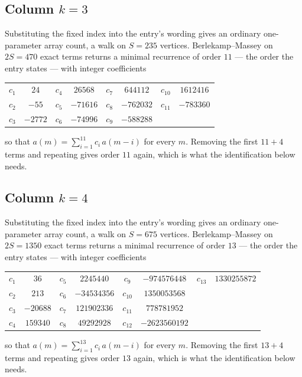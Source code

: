 \documentclass[11pt,a4paper]{article}
\theoremstyle{plain}
\theoremstyle{definition}
\begin{document}
\subsection*{Column $k=3$}
Substituting the fixed index into the entry's wording gives an ordinary one-parameter array
count, a walk on $S=235$ vertices. Berlekamp--Massey on $2S=470$ exact terms
returns a minimal recurrence of order $11$ --- the order the entry states --- with
integer coefficients
\begin{center}\small\begin{tabular}{cccccccc}
$c_{1}$ & $24$ & $c_{4}$ & $26568$ & $c_{7}$ & $644112$ & $c_{10}$ & $1612416$ \\
$c_{2}$ & $-55$ & $c_{5}$ & $-71616$ & $c_{8}$ & $-762032$ & $c_{11}$ & $-783360$ \\
$c_{3}$ & $-2772$ & $c_{6}$ & $-74996$ & $c_{9}$ & $-588288$ &  &  \\
\end{tabular}\end{center}
so that $a(m)=\sum_{i=1}^{11}c_i\,a(m-i)$ for every $m$. Removing the first
$11+4$ terms and repeating gives order $11$ again, which is what the
identification below needs.

\subsection*{Column $k=4$}
Substituting the fixed index into the entry's wording gives an ordinary one-parameter array
count, a walk on $S=675$ vertices. Berlekamp--Massey on $2S=1350$ exact terms
returns a minimal recurrence of order $13$ --- the order the entry states --- with
integer coefficients
\begin{center}\small\begin{tabular}{cccccccc}
$c_{1}$ & $36$ & $c_{5}$ & $2245440$ & $c_{9}$ & $-974576448$ & $c_{13}$ & $1330255872$ \\
$c_{2}$ & $213$ & $c_{6}$ & $-34534356$ & $c_{10}$ & $1350053568$ &  &  \\
$c_{3}$ & $-20688$ & $c_{7}$ & $121902336$ & $c_{11}$ & $778781952$ &  &  \\
$c_{4}$ & $159340$ & $c_{8}$ & $49292928$ & $c_{12}$ & $-2623560192$ &  &  \\
\end{tabular}\end{center}
so that $a(m)=\sum_{i=1}^{13}c_i\,a(m-i)$ for every $m$. Removing the first
$13+4$ terms and repeating gives order $13$ again, which is what the
identification below needs.
\end{document}
